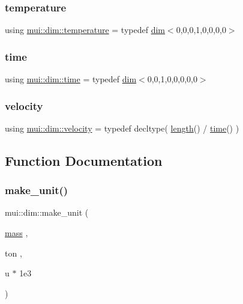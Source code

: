 \subsubsection{\texorpdfstring{temperature}{temperature}}
{\footnotesize\ttfamily using \hyperlink{namespacemui_1_1dim_a3d9b1e07165d3ef9a3d9213035e05d8e}{mui\+::dim\+::temperature} = typedef \hyperlink{structmui_1_1dim_1_1dim}{dim}$<$0,0,0,1,0,0,0,0$>$}

\mbox{\label{namespacemui_1_1dim_a3d3a0014025f1c2c0dd7418791928500}} 
\subsubsection{\texorpdfstring{time}{time}}
{\footnotesize\ttfamily using \hyperlink{namespacemui_1_1dim_a3d3a0014025f1c2c0dd7418791928500}{mui\+::dim\+::time} = typedef \hyperlink{structmui_1_1dim_1_1dim}{dim}$<$0,0,1,0,0,0,0,0$>$}

\mbox{\label{namespacemui_1_1dim_a2ed9711eaaf9db79861b69ffa35d277d}} 
\subsubsection{\texorpdfstring{velocity}{velocity}}
{\footnotesize\ttfamily using \hyperlink{namespacemui_1_1dim_a2ed9711eaaf9db79861b69ffa35d277d}{mui\+::dim\+::velocity} = typedef decltype( \hyperlink{namespacemui_1_1dim_ade9a9679bc46e16322ef419974faebe6}{length}() / \hyperlink{namespacemui_1_1dim_a3d3a0014025f1c2c0dd7418791928500}{time}() )}



\subsection{Function Documentation}
\mbox{\label{namespacemui_1_1dim_a0c3efce89a5c9d83b972a3e8d76a1a46}} 
\subsubsection{\texorpdfstring{make\+\_\+unit()}{make\_unit()}\hspace{0.1cm}{\footnotesize\ttfamily [1/32]}}
{\footnotesize\ttfamily mui\+::dim\+::make\+\_\+unit (\begin{DoxyParamCaption}\item[{\hyperlink{namespacemui_1_1dim_a7b17424f4316e37d7970ee09857ccddf}{mass}}]{,  }\item[{ton}]{,  }\item[{u $\ast$}]{1e3 }\end{DoxyParamCaption})}

